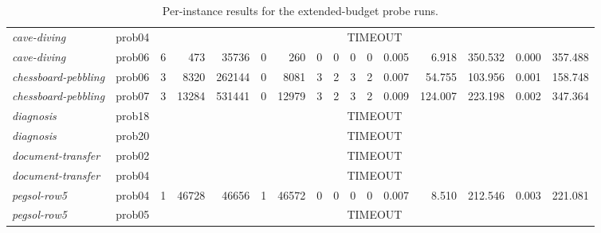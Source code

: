 \begin{table}[H]
{\begin{tabular}{llrrr rr rr rr rrrrr}
            \textit{cave-diving}         & prob04                                & \multicolumn{14}{c}{TIMEOUT}                                                                                                                         \\
            \textit{cave-diving}         & prob06                                & 6                                 & 473         & 35736       & 0            & 260   & 0 & 0  & 0 & 0  & 0.005 & 6.918   & 350.532 & 0.000 & 357.488 \\
            \textit{chessboard-pebbling} & prob06                                & 3                                 & 8320        & 262144      & 0            & 8081  & 3 & 2  & 3 & 2  & 0.007 & 54.755  & 103.956 & 0.001 & 158.748 \\
            \textit{chessboard-pebbling} & prob07                                & 3                                 & 13284       & 531441      & 0            & 12979 & 3 & 2  & 3 & 2  & 0.009 & 124.007 & 223.198 & 0.002 & 347.364 \\
            \textit{diagnosis}           & prob18                                & \multicolumn{14}{c}{TIMEOUT}                                                                                                                         \\
            \textit{diagnosis}           & prob20                                & \multicolumn{14}{c}{TIMEOUT}                                                                                                                         \\
            \textit{document-transfer}   & prob02                                & \multicolumn{14}{c}{TIMEOUT}                                                                                                                         \\
            \textit{document-transfer}   & prob04                                & \multicolumn{14}{c}{TIMEOUT}                                                                                                                         \\
            \textit{pegsol-row5}         & prob04                                & 1                                 & 46728       & 46656       & 1            & 46572 & 0 & 0  & 0 & 0  & 0.007 & 8.510   & 212.546 & 0.003 & 221.081 \\
            \textit{pegsol-row5}         & prob05                                & \multicolumn{14}{c}{TIMEOUT}                                                                                                                         \\
            \bottomrule
        \end{tabular}%
    }
    \caption{Per-instance results for the extended-budget probe runs.}
    \label{tab:appendix_extended}
\end{table}

